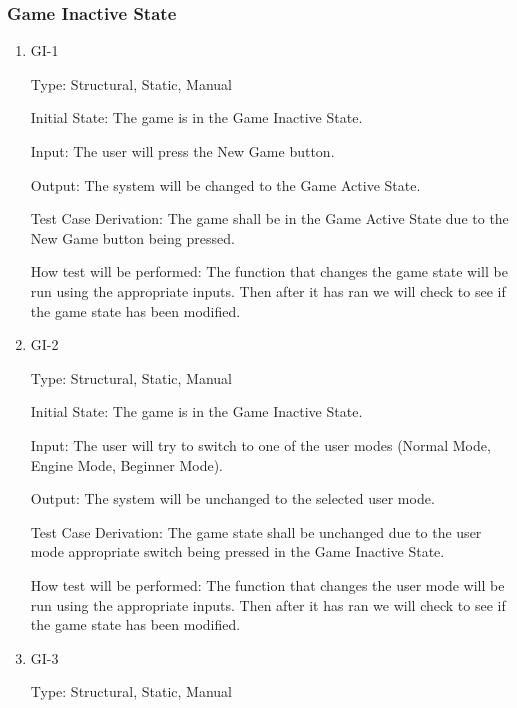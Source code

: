 \documentclass[12pt, titlepage]{article}
\begin{document}
\subsubsection{Game Inactive State}

\begin{enumerate}

  \item{GI-1\\}

  Type: Structural, Static, Manual
                      
  Initial State: The game is in the Game Inactive State.
                      
  Input: The user will press the New Game button.
                      
  Output: The system will be changed to the Game Active State.
                      
  Test Case Derivation: The game shall be in the Game Active State due to the New Game button being pressed.
  
  How test will be performed: The function that changes the game state will be run using the appropriate inputs.
  Then after it has ran we will check to see if the game state has been modified.

  \item{GI-2\\}

  Type: Structural, Static, Manual
                      
  Initial State: The game is in the Game Inactive State.
                      
  Input: The user will  try to switch to one of the user modes (Normal Mode, Engine Mode, Beginner Mode).
  
  Output: The system will be unchanged to the selected user mode.
                      
  Test Case Derivation: The game state shall be unchanged due to the user mode appropriate switch being pressed in the Game Inactive State.
  
  How test will be performed: The function that changes the user mode will be run using the appropriate inputs.
  Then after it has ran we will check to see if the game state has been modified.

  \item{GI-3\\}

  Type: Structural, Static, Manual
                      

\end{enumerate}
\end{document}
